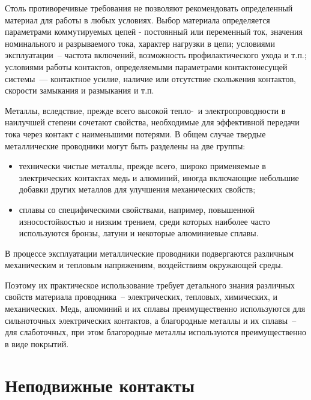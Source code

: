 Столь противоречивые требования не позволяют рекомендовать определенный материал для работы в любых условиях. Выбор материала определяется параметрами коммутируемых цепей - постоянный или переменный ток, значения номинального и разрываемого тока, характер нагрузки в цепи; условиями эксплуатации~-- частота включений, возможность профилактического ухода и т.п.; условиями работы контактов, определяемыми параметрами контактонесущей системы~--- контактное усилие, наличие или отсутствие скольжения контактов, скорости замыкания и размыкания и т.п.


Металлы, вследствие, прежде всего высокой тепло-~и электропроводности в наилучшей степени сочетают свойства, необходимые для эффективной передачи тока через контакт с наименьшими потерями. В общем случае твердые металлические проводники могут быть разделены на две группы:
\begin{itemize}
\item технически чистые металлы, прежде всего, широко применяемые в электрических контактах медь и алюминий, иногда включающие небольшие добавки других металлов для улучшения механических свойств;
\item сплавы со специфическими свойствами, например, повышенной износостойкостью и низким трением, среди которых наиболее часто используются бронзы, латуни и некоторые алюминиевые сплавы.
\end{itemize}

В процессе эксплуатации металлические проводники подвергаются различным механическим и тепловым напряжениям, воздействиям окружающей среды.

Поэтому их практическое использование требует детального знания различных свойств материала проводника~-- электрических, тепловых, химических, и механических. Медь, алюминий и их сплавы преимущественно используются для сильноточных электрических контактов, а благородные металлы и их сплавы~-- для слаботочных, при этом благородные металлы используются преимущественно в виде покрытий. 

\section{ Неподвижные контакты }

